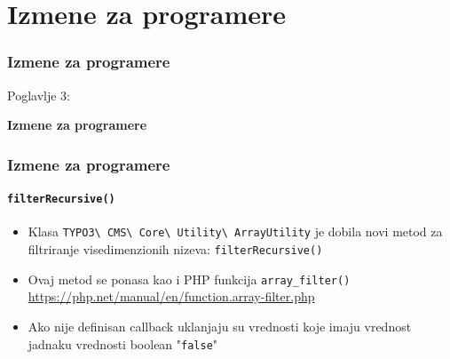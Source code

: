 %

\section{Izmene za programere}
\begin{frame}[fragile]
	\frametitle{Izmene za programere}

	\begin{center}\huge{Poglavlje 3:}\end{center}
	\begin{center}\huge{\color{typo3darkgrey}\textbf{Izmene za programere}}\end{center}

\end{frame}


\begin{frame}[fragile]
	\frametitle{Izmene za programere}
	\framesubtitle{\texttt{filterRecursive()}}

	\begin{itemize}
		\item Klasa
			\texttt{TYPO3\textbackslash
				CMS\textbackslash
				Core\textbackslash
				Utility\textbackslash
				ArrayUtility}\newline
			je dobila novi metod za filtriranje visedimenzionih nizeva:\newline
			\texttt{filterRecursive()}
		\item Ovaj metod se ponasa kao i PHP funkcija \texttt{array\_filter()}\newline
			\small
				\href{https://php.net/manual/en/function.array-filter.php}{https://php.net/manual/en/function.array-filter.php}
			\normalsize
		\item Ako nije definisan callback uklanjaju su vrednosti koje imaju vrednost jadnaku vrednosti boolean "\texttt{false}"
	\end{itemize}

\end{frame}

